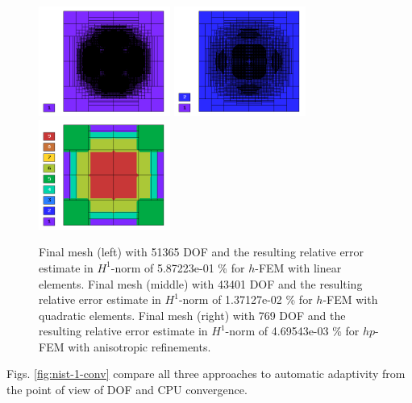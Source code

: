 \documentclass[12pt]{elsarticle}
\begin{document}
\begin{figure}[H]
\centering
\vspace{-5mm}
\includegraphics[height=3.6cm]{nist/nist-1/mesh_h1_aniso.png}
\includegraphics[height=3.6cm]{nist/nist-1/mesh_h2_aniso.png}
\includegraphics[height=3.6cm]{nist/nist-1/mesh_hp_aniso.png}
\vspace{-5mm}
\caption{
Final mesh (left) with 51365 DOF and the resulting
relative error estimate in $H^1$-norm of 5.87223e-01 \% for $h$-FEM with linear elements.
Final mesh (middle) with 43401 DOF and the resulting
relative error estimate in $H^1$-norm of 1.37127e-02 \% for $h$-FEM with quadratic elements.
Final mesh (right) with 769 DOF and the resulting
relative error estimate in $H^1$-norm of 4.69543e-03 \% for $hp$-FEM with anisotropic refinements.}
\label{fig:nist-1-hp-aniso}
\end{figure}

Figs. \ref{fig:nist-1-conv} compare all
three approaches to automatic adaptivity from the point
of view of DOF and CPU convergence.
\end{document}
